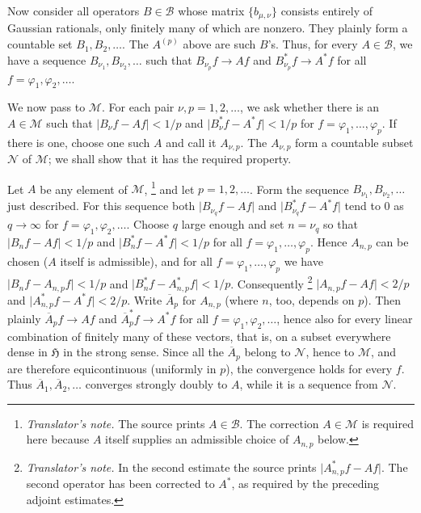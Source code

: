 \documentclass[
  paper=b5,
  twoside=true,
  fontsize=13pt,
  headings=normal,
  bookmarkpackage=false
]{scrartcl}
\theoremstyle{definition}
\newcounter{translatornote}
\newcounter{savedfootnote}
\newcommand{\TranslatorNote}[1]{%
  \stepcounter{translatornote}%
  \setcounter{savedfootnote}{\value{footnote}}%
  \begingroup
    \renewcommand{\thefootnote}{T\arabic{translatornote}}%
    \footnote{\textit{Translator's note.} #1}%
  \endgroup
  \setcounter{footnote}{\value{savedfootnote}}}
\begin{document}
Now consider all operators \(B\in\mathcal B\) whose matrix
\(\{b_{\mu,\nu}\}\) consists entirely of Gaussian rationals, only finitely
many of which are nonzero.  They plainly form a countable set
\(B_1,B_2,\ldots\).  The \(A^{(p)}\) above are such \(B\)'s.  Thus, for
every \(A\in\mathcal B\), we have a sequence
\(B_{\nu_1},B_{\nu_2},\ldots\) such that
\(B_{\nu_p}f\to Af\) and \(B_{\nu_p}^*f\to A^*f\)
for all \(f=\varphi_1,\varphi_2,\ldots\).

We now pass to \(\mathcal M\).  For each pair
\(\nu,p=1,2,\ldots\), we ask whether there is an \(A\in\mathcal M\) such
that \(\lvert B_\nu f-Af\rvert<1/p\) and
\(\lvert B_\nu^*f-A^*f\rvert<1/p\) for \(f=\varphi_1,\ldots,\varphi_p\).
If there is one, choose one such \(A\) and call it \(A_{\nu,p}\).  The
\(A_{\nu,p}\) form a countable subset \(\mathcal N\) of
\(\mathcal M\); we shall show that it has the required property.

Let \(A\) be any element of \(\mathcal M\),\TranslatorNote{The source
prints \(A\in\mathcal B\). The correction \(A\in\mathcal M\) is required
here because \(A\) itself supplies an admissible choice of \(A_{n,p}\)
below.} and let \(p=1,2,\ldots\). Form the sequence
\(B_{\nu_1},B_{\nu_2},\ldots\) just described. For this sequence both
\(\lvert B_{\nu_q}f-Af\rvert\) and \(\lvert B_{\nu_q}^*f-A^*f\rvert\)
tend to \(0\) as \(q\to\infty\) for \(f=\varphi_1,\varphi_2,\ldots\).
Choose \(q\) large enough and set \(n=\nu_q\) so that
\(\lvert B_nf-Af\rvert<1/p\) and \(\lvert B_n^*f-A^*f\rvert<1/p\) for
all \(f=\varphi_1,\ldots,\varphi_p\). Hence \(A_{n,p}\) can be chosen
(\(A\) itself is admissible), and for all \(f=\varphi_1,\ldots,\varphi_p\)
we have \(\lvert B_nf-A_{n,p}f\rvert<1/p\) and
\(\lvert B_n^*f-A_{n,p}^*f\rvert<1/p\). Consequently\TranslatorNote{In the
second estimate the source prints \(\lvert A_{n,p}^*f-Af\rvert\).
The second operator has been corrected to \(A^*\), as required by the
preceding adjoint estimates.}
\(\lvert A_{n,p}f-Af\rvert<2/p\) and
\(\lvert A_{n,p}^*f-A^*f\rvert<2/p\). Write \(\overline A_p\) for
\(A_{n,p}\) (where \(n\), too, depends on \(p\)). Then plainly
\(\overline A_pf\to Af\) and \(\overline A_p^*f\to A^*f\)
for all \(f=\varphi_1,\varphi_2,\ldots\), hence also for every linear
combination of finitely many of these vectors, that is, on a subset
everywhere dense in \(\mathfrak H\) in the strong sense.  Since all the
\(\overline A_p\) belong to \(\mathcal N\), hence to \(\mathcal M\),
and are therefore equicontinuous (uniformly in \(p\)), the convergence
holds for every \(f\).  Thus
\(\overline A_1,\overline A_2,\ldots\) converges strongly doubly to
\(A\), while it is a sequence from \(\mathcal N\).
\end{document}
